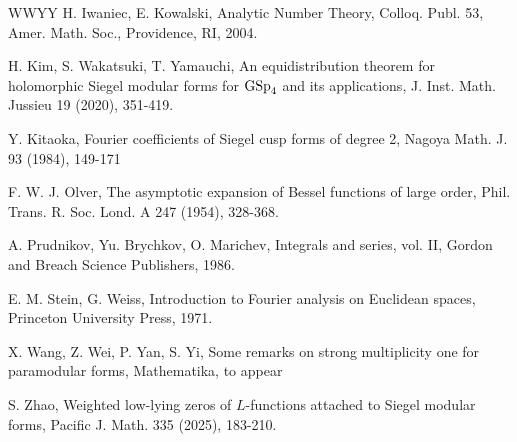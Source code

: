 \documentclass[11pt]{amsart}
\numberwithin{equation}{section}
\theoremstyle{plain}
\theoremstyle{definition}
\numberwithin{equation}{section}
\begin{document}
\begin{thebibliography}{WWYY}
 H.  Iwaniec, E.  Kowalski,  Analytic Number Theory, Colloq. Publ.  53, Amer. Math. Soc., Providence, RI, 2004.

 H. Kim,  S. Wakatsuki,   T. Yamauchi, An equidistribution theorem
for holomorphic Siegel modular forms for ${\rm GSp}_4$ and its applications,  J. Inst. Math. Jussieu 19  (2020),  351-419.

 Y. Kitaoka,  Fourier coefficients of Siegel cusp forms of degree 2, Nagoya Math. J.  93 (1984), 149-171

 F. W. J. Olver,  The asymptotic expansion of Bessel functions of large order, Phil. Trans. R. Soc. Lond. A  247
(1954), 328-368.

 A. Prudnikov, Yu. Brychkov, O. Marichev, Integrals and series, vol. II, Gordon and Breach Science Publishers, 1986.

 E. M. Stein, G. Weiss, Introduction to Fourier analysis on Euclidean spaces, Princeton University Press, 1971.

 X. Wang, Z. Wei, P. Yan, S. Yi, Some remarks on strong multiplicity one for paramodular forms, Mathematika, to appear %

 S. Zhao,  Weighted low-lying zeros of $L$-functions attached to Siegel modular forms, Pacific J. Math. 335 (2025), 183-210.


\end{thebibliography}

 
\end{document}
